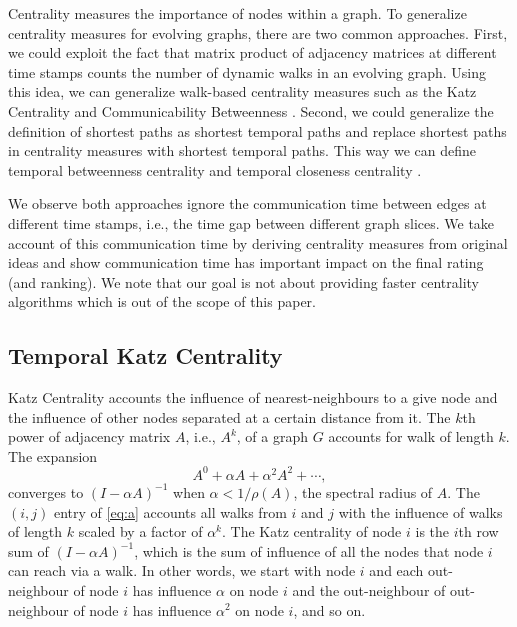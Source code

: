 \documentclass[12pt]{article}
\theoremstyle{definition}
\begin{document}
Centrality measures the importance of nodes within a graph.
To generalize centrality measures for evolving graphs, there are two common approaches.
First, we could exploit the fact that matrix product of adjacency matrices at different time stamps counts the number of dynamic walks in an evolving graph. Using this idea, we can generalize walk-based centrality measures such as
the Katz Centrality \cite{estrada09} and Communicability Betweenness \cite{alsayed15}.
Second, we could generalize the definition of shortest paths as shortest temporal paths and replace shortest paths in centrality measures with shortest temporal paths. This way we can define temporal betweenness centrality and temporal closeness centrality \cite{nicosia13}.

We observe both approaches ignore the communication time between edges at different time stamps, i.e., the time gap between different graph slices. We take account of this communication time by deriving centrality measures from original ideas and show communication time has important impact on the final rating (and ranking).
We note that our goal is not about providing faster centrality algorithms which is out of the scope of this paper.

\subsection{Temporal Katz Centrality}
\label{sec:temp-katz-centr}

Katz Centrality accounts the influence of nearest-neighbours to a give node and the influence of other nodes
separated at a certain distance from it. The $k$th power of adjacency matrix $A$, i.e., $A^k$, of a graph $G$ accounts for walk of length $k$. The expansion
\begin{equation}
  \label{eq:a}
  A^0 + \alpha A + \alpha^2 A^2 + \cdots,
\end{equation}
converges to $(I - \alpha A)^{-1}$ when $\alpha < 1/\rho(A)$, the spectral radius of $A$. The $(i,j)$ entry of \eqref{eq:a}
accounts all walks from $i$ and $j$ with the influence of walks of length $k$ scaled by a factor of $\alpha^k$.
The Katz centrality of node $i$ is the $i$th row sum of $(I - \alpha A)^{-1}$, which is the sum of influence of all the nodes that node $i$ can reach via a walk.
In other words, we start with node $i$ and each out-neighbour of node $i$ has influence $\alpha$ on node $i$ and the out-neighbour of out-neighbour of node $i$ has influence $\alpha^2$ on node $i$, and so on.
\end{document}
